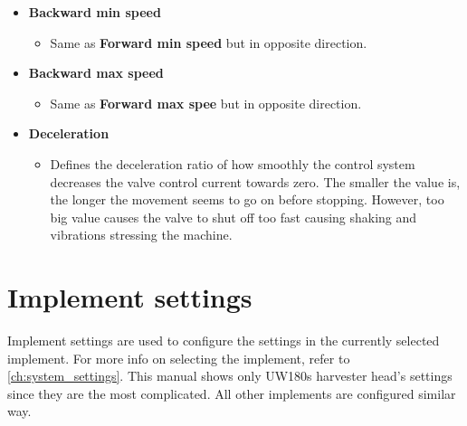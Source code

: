 \documentclass[12pt,a4paper,english]{uvmanual}
\begin{document}
\begin{itemize}
 \item \textbf{Backward min speed}
 \begin{itemize}
  \item Same as \textbf{Forward min speed} but in opposite direction.
 \end{itemize}

 \item \textbf{Backward max speed}
 \begin{itemize}
  \item Same as \textbf{Forward max spee} but in opposite direction.
 \end{itemize}

 \item \textbf{Deceleration}
 \begin{itemize}
  \item Defines the deceleration ratio of how smoothly the control system decreases the valve control current towards zero. The smaller the value is, the longer the movement seems to go on before stopping. However, too big value causes the valve to shut off too fast causing shaking and vibrations stressing the machine.
 \end{itemize}

\end{itemize}



\section{Implement settings}\label{ch:settings_implement}

Implement settings are used to configure the settings in the currently selected implement. For more info on selecting the implement, refer to \autoref{ch:system_settings}. This manual shows only UW180s harvester head's settings since they are the most complicated. All other implements are configured similar way.

\end{document}
